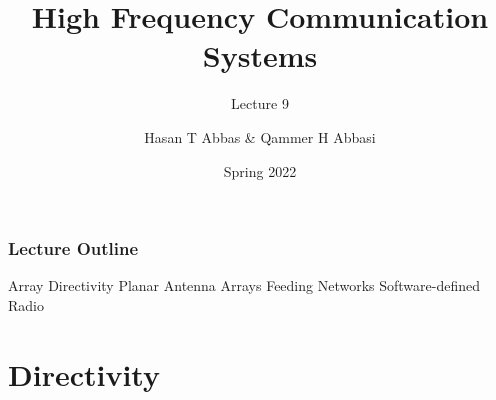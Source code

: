 \documentclass[10pt]{beamer}
\title{High Frequency Communication Systems}
\subtitle{Lecture 9}
\date{Spring 2022}
\author{Hasan T Abbas \& Qammer H Abbasi}
\begin{document}
\maketitle

\begin{frame}[fragile]
    \frametitle{Lecture Outline}
    \begin{outline}[itemize]
        \1 Array Directivity
        \1 Planar Antenna Arrays
        \1 Feeding Networks
        \1 Software-defined Radio 
    \end{outline}
\end{frame}

\section{Directivity}
\end{document}

